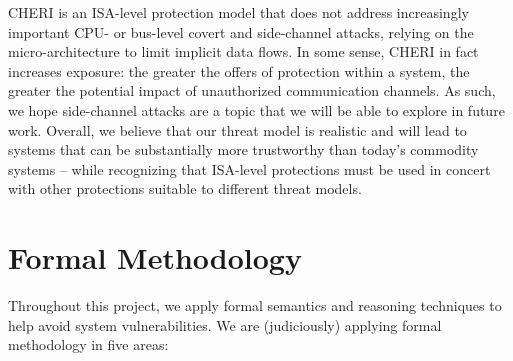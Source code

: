 CHERI is an ISA-level protection model that does not address increasingly
important CPU- or bus-level covert and side-channel attacks, relying on the
micro-architecture to limit implicit data flows.
In some sense, CHERI in fact increases exposure: the greater the offers of
protection within a system, the greater the potential impact of unauthorized
communication channels.
As such, we hope side-channel attacks are a topic that we will be able to
explore in future work.  
Overall, we believe that our threat model is realistic and will
lead to systems that can be substantially more trustworthy than
today's commodity systems -- while recognizing that ISA-level protections must
be used in concert with other protections suitable to different threat models.

\section{Formal Methodology}

Throughout this project, we apply formal semantics and reasoning techniques to help avoid
system vulnerabilities.
We are (judiciously) applying formal methodology in
five areas:

